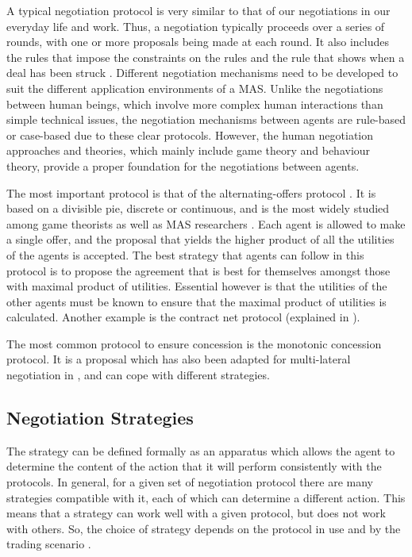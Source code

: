A typical negotiation protocol is very similar to that of our negotiations in our everyday life and work. Thus, a negotiation typically proceeds over a series of rounds, with one or more proposals being made at each round. It also includes the rules that impose the constraints on the rules and the rule that shows when a deal has been struck \citep{fatima2014principles}. Different negotiation mechanisms need to be developed to suit the different application environments of a MAS. Unlike the negotiations between human beings, which involve more complex human interactions than simple technical issues, the negotiation mechanisms between agents are rule-based or case-based due to these clear protocols. However, the human negotiation approaches and theories, which mainly include game theory and behaviour theory, provide a proper foundation for the negotiations between agents. 

The most important protocol is that of the alternating-offers protocol \citep{rubinstein1982perfect}. It is based on a divisible pie, discrete or continuous, and is the most widely studied among game theorists as well as MAS researchers \citep{fatima2014principles}. Each agent is allowed to make a single offer, and the proposal that yields the higher product of all the utilities of the agents is accepted. The best strategy that agents can follow in this protocol is to propose the agreement that is best for themselves amongst those with maximal product of utilities. Essential however is that the utilities of the other agents must be known to ensure that the maximal product of utilities is calculated. Another example is the contract net protocol (explained in ). 

The most common protocol to ensure concession is the monotonic concession protocol. It is a proposal which has also been adapted for multi-lateral negotiation in \citep{endriss2006monotonic}, and can cope with different strategies.

\subsection{Negotiation Strategies}
The strategy can be defined formally as an apparatus which allows the agent to determine the content of the action that it will perform consistently with the protocols. In general, for a given set of negotiation protocol there are many strategies compatible with it, each of which can determine a different action. This means that a strategy can work well with a given protocol, but does not work with others. So, the choice of strategy depends on the protocol in use and by the trading scenario \citep{di2015multi}.

